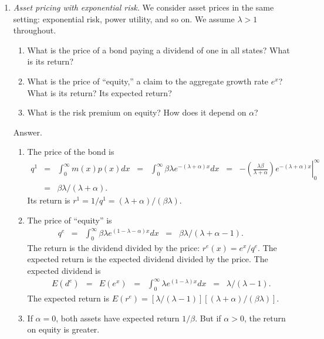 \documentclass[11pt]{article}
\begin{document}
\begin{enumerate}
\item {\it Asset pricing with exponential risk.\/}
We consider asset prices in the same setting:
exponential risk, power utility, and so on.
We assume $\lambda > 1$ throughout.
\begin{enumerate}
\item What is the price of a bond paying a dividend of one in all states?
What is its return?
\item What is the price of ``equity,'' a claim to the aggregate growth rate $e^x$?
What is its return?  Its expected return?
\item What is the risk premium on equity?  How does it depend on $\alpha$?
\end{enumerate}
%
Answer.
\begin{enumerate}
\item The price of the bond is
\begin{eqnarray*}
    q^1 &=& \int_{0}^\infty  m(x) p(x) dx
            \;\;=\;\; \int_{0}^\infty \beta \lambda e^{-(\lambda + \alpha) x} dx
            \;\;=\;\; \left. - \left( \frac{\lambda \beta}{\lambda + \alpha} \right) e^{-(\lambda + \alpha) x} \right|_0^\infty  \\
        &=& \beta \lambda /(\lambda + \alpha) . \phantom{sum^K}
\end{eqnarray*}
Its return is $r^1 = 1/q^1 = (\lambda + \alpha)/(\beta \lambda )$.

\item The price of ``equity'' is
\begin{eqnarray*}
    q^e &=& \int_{0}^\infty \beta \lambda e^{(1-\lambda -\alpha) x} dx
            \;\;=\;\; \beta \lambda /(\lambda + \alpha-1) . \phantom{sum^K}
\end{eqnarray*}
The return is the dividend divided by the price:  $r^e(x) = e^x/q^e$.
The expected return is the expected dividend divided by the price.
The expected dividend is
\begin{eqnarray*}
    E(d^e) &=& E(e^x) \;\;=\;\; \int_{0}^\infty \lambda e^{(1-\lambda) x} dx
            \;\;=\;\; \lambda/(\lambda-1) .
\end{eqnarray*}
The expected return is $ E(r^e) = [\lambda/(\lambda-1)] [(\lambda+\alpha)/(\beta \lambda) ]$.

\item If $\alpha = 0$, both assets have expected return $1/\beta$.
But if $\alpha > 0$, the return on equity is greater.

\end{enumerate}
\end{enumerate}



\end{document}
